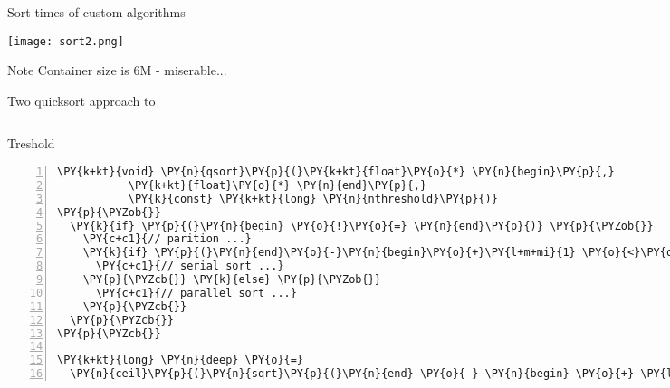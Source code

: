\documentclass{beamer}
\begin{document}

\begin{frame}[fragile]{Sort times of custom algorithms}

\begin{center}
\texttt{[image: sort2.png]} 
\end{center}


\begin{exampleblock}{Note}
\small
Container size is 6M - miserable...
\end{exampleblock}

\end{frame}



\begin{frame}[fragile]{Two quicksort approach to }

\begin{columns}[t]

\column{1.7in}
\begin{block}{Treshold}
\tiny
\begin{Verbatim}[commandchars=\\\{\},numbers=left,firstnumber=1,stepnumber=1]
\PY{k+kt}{void} \PY{n}{qsort}\PY{p}{(}\PY{k+kt}{float}\PY{o}{*} \PY{n}{begin}\PY{p}{,}
           \PY{k+kt}{float}\PY{o}{*} \PY{n}{end}\PY{p}{,}
           \PY{k}{const} \PY{k+kt}{long} \PY{n}{nthreshold}\PY{p}{)}
\PY{p}{\PYZob{}}
  \PY{k}{if} \PY{p}{(}\PY{n}{begin} \PY{o}{!}\PY{o}{=} \PY{n}{end}\PY{p}{)} \PY{p}{\PYZob{}}
    \PY{c+c1}{// parition ...}
    \PY{k}{if} \PY{p}{(}\PY{n}{end}\PY{o}{-}\PY{n}{begin}\PY{o}{+}\PY{l+m+mi}{1} \PY{o}{<}\PY{o}{=} \PY{n}{nthreshold}\PY{p}{)} \PY{p}{\PYZob{}}
      \PY{c+c1}{// serial sort ...}
    \PY{p}{\PYZcb{}} \PY{k}{else} \PY{p}{\PYZob{}}
      \PY{c+c1}{// parallel sort ...}
    \PY{p}{\PYZcb{}}
  \PY{p}{\PYZcb{}}
\PY{p}{\PYZcb{}}

\PY{k+kt}{long} \PY{n}{deep} \PY{o}{=}
  \PY{n}{ceil}\PY{p}{(}\PY{n}{sqrt}\PY{p}{(}\PY{n}{end} \PY{o}{-} \PY{n}{begin} \PY{o}{+} \PY{l+m+mi}{1}\PY{p}{)}\PY{p}{)} \PY{o}{/} \PY{l+m+mi}{2}\PY{p}{;}
\end{Verbatim}

\end{block}

\column{1.5in}
\begin{block}{Depth}
\tiny
\begin{Verbatim}[commandchars=\\\{\},numbers=left,firstnumber=1,stepnumber=1]
\PY{k+kt}{void} \PY{n}{qsort}\PY{p}{(}\PY{k+kt}{float}\PY{o}{*} \PY{n}{begin}\PY{p}{,}
           \PY{k+kt}{float}\PY{o}{*} \PY{n}{end}\PY{p}{,}
           \PY{k}{const} \PY{k+kt}{int} \PY{n}{deep}\PY{p}{)}
\PY{p}{\PYZob{}}
  \PY{k}{if} \PY{p}{(}\PY{n}{begin} \PY{o}{!}\PY{o}{=} \PY{n}{end}\PY{p}{)} \PY{p}{\PYZob{}}
    \PY{c+c1}{// parition ...}
    \PY{k}{if} \PY{p}{(}\PY{n}{deep}\PY{p}{)} \PY{p}{\PYZob{}}
      \PY{c+c1}{// serial sort ...}
    \PY{p}{\PYZcb{}} \PY{k}{else} \PY{p}{\PYZob{}}
      \PY{c+c1}{// parallel sort with deep-1}
    \PY{p}{\PYZcb{}}
  \PY{p}{\PYZcb{}}
\PY{p}{\PYZcb{}}


\end{Verbatim}
\end{block}
\end{columns}
\end{frame}
\end{document}
